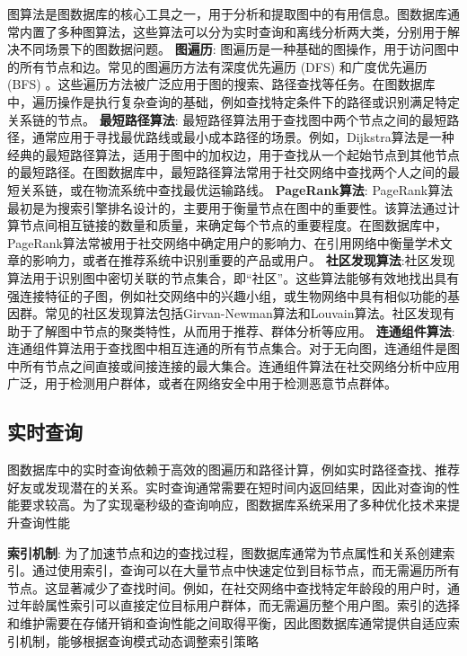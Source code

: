 图算法是图数据库的核心工具之一，用于分析和提取图中的有用信息。图数据库通常内置了多种图算法，这些算法可以分为实时查询和离线分析两大类，分别用于解决不同场景下的图数据问题。
\textbf{图遍历}: 图遍历是一种基础的图操作，用于访问图中的所有节点和边。常见的图遍历方法有深度优先遍历  (DFS)  和广度优先遍历  (BFS)  。这些遍历方法被广泛应用于图的搜索、路径查找等任务。在图数据库中，遍历操作是执行复杂查询的基础，例如查找特定条件下的路径或识别满足特定关系链的节点。
\textbf{最短路径算法}: 最短路径算法用于查找图中两个节点之间的最短路径，通常应用于寻找最优路线或最小成本路径的场景。例如，Dijkstra算法是一种经典的最短路径算法，适用于图中的加权边，用于查找从一个起始节点到其他节点的最短路径。在图数据库中，最短路径算法常用于社交网络中查找两个人之间的最短关系链，或在物流系统中查找最优运输路线。
\textbf{PageRank算法}: PageRank算法最初是为搜索引擎排名设计的，主要用于衡量节点在图中的重要性。该算法通过计算节点间相互链接的数量和质量，来确定每个节点的重要程度。在图数据库中，PageRank算法常被用于社交网络中确定用户的影响力、在引用网络中衡量学术文章的影响力，或者在推荐系统中识别重要的产品或用户。
\textbf{社区发现算法}:社区发现算法用于识别图中密切关联的节点集合，即“社区”。这些算法能够有效地找出具有强连接特征的子图，例如社交网络中的兴趣小组，或生物网络中具有相似功能的基因群。常见的社区发现算法包括Girvan-Newman算法和Louvain算法。社区发现有助于了解图中节点的聚类特性，从而用于推荐、群体分析等应用。
\textbf{连通组件算法}: 连通组件算法用于查找图中相互连通的所有节点集合。对于无向图，连通组件是图中所有节点之间直接或间接连接的最大集合。连通组件算法在社交网络分析中应用广泛，用于检测用户群体，或者在网络安全中用于检测恶意节点群体。


\vspace{1cm}
\subsection{实时查询}

图数据库中的实时查询依赖于高效的图遍历和路径计算，例如实时路径查找、推荐好友或发现潜在的关系。实时查询通常需要在短时间内返回结果，因此对查询的性能要求较高。为了实现毫秒级的查询响应，图数据库系统采用了多种优化技术来提升查询性能

\textbf{索引机制}: 为了加速节点和边的查找过程，图数据库通常为节点属性和关系创建索引。通过使用索引，查询可以在大量节点中快速定位到目标节点，而无需遍历所有节点。这显著减少了查找时间。例如，在社交网络中查找特定年龄段的用户时，通过年龄属性索引可以直接定位目标用户群体，而无需遍历整个用户图。索引的选择和维护需要在存储开销和查询性能之间取得平衡，因此图数据库通常提供自适应索引机制，能够根据查询模式动态调整索引策略

